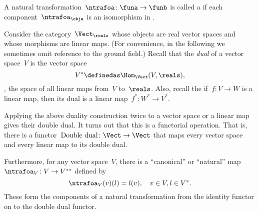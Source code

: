 \begin{figure}[h!]
  \begin{center}
  \end{center}
  \caption{}
  \label{fig:nat_trans_graphically}
\end{figure}

\begin{ctdefinition}
  \label{def:nat_iso}
  A natural transformation~$\ntrafoa \colon \funa \to \funb $ is called a \emph{} if each component~$\ntrafoa_\obja$ is an isomorphism in \CatD.
\end{ctdefinition}




\begin{example}\label{ex:Vect}
  Consider the category~$\Vect_{\reals}$ whose objects are real vector spaces and whose morphisms are linear maps. (For convenience, in the following we sometimes omit reference to the ground field.) Recall that the \emph{dual} of a vector space~$V$ is the vector space
  \begin{equation*}
    V^* \definedas \Hom_{\Vect}(V, \reals),
  \end{equation*}
  \ie , the space of all linear maps from~$V$ to~$\reals$. Also, recall the if~$f\colon V \to W$ is a linear map, then its dual is a linear map~$f^*\colon W^* \to V^*$.

  Applying the above duality construction twice to a vector space or a linear map gives their double dual. It turns out that this is a functorial operation. That is, there is a functor~$\text{Double dual}\colon \Vect \to \Vect$ that maps every vector space and every linear map to its double dual.

  Furthermore, for any vector space~$V$, there is a ``canonical'' or ``natural'' map~$\ntrafoa_V \colon V \to V^{**}$ defined by
  \begin{equation*}
    \ntrafoa_V(v)(l) = l(v), \quad  v \in V, l \in V^*.
  \end{equation*}
  These form the components of a natural transformation from the identity functor on \Vect to the double dual functor.
  \begin{center}
  \end{center}
\end{example}




